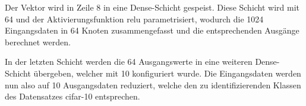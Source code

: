 Der Vektor wird in Zeile 8 in eine Dense-Schicht gespeist. Diese Schicht wird mit 64  und der  Aktivierungsfunktion \ac{relu} parametrisiert, wodurch die 1024 Eingangsdaten in 64 Knoten zusammengefasst und die entsprechenden Ausgänge berechnet werden.

In der letzten Schicht werden die 64 Ausgangswerte in eine weiteren Dense-Schicht übergeben, welcher mit 10  konfiguriert wurde. Die Eingangsdaten werden nun also auf 10 Ausgangsdaten reduziert, welche den zu identifizierenden Klassen des  Datensatzes \ac{cifar}-10 entsprechen.
 












